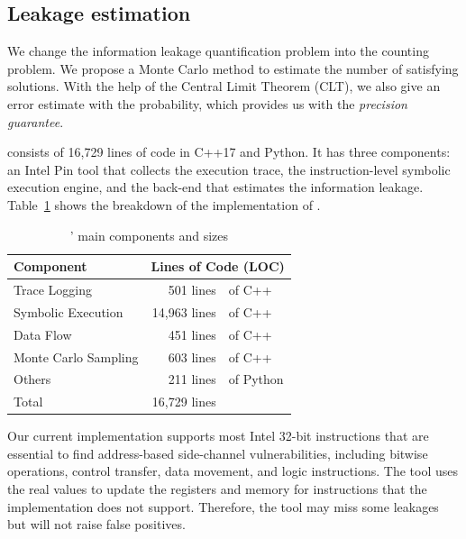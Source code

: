 \subsection{Leakage estimation} 
We change the information leakage quantification problem into the counting problem. We propose a
Monte Carlo method to estimate the number of satisfying solutions. With the help of the Central Limit Theorem (CLT), we also give an error
estimate with the probability, which provides us with the \emph{precision guarantee}.

\tool{} consists of 16,729 lines of code in C++17 and Python. It has three components: an Intel Pin tool that collects the execution trace, the
instruction-level symbolic execution engine, and the back-end that estimates the information leakage. Table~\ref{tbl:implementation} shows the breakdown of the implementation of \tool{}.

\begin{table}[h!]
    \centering
    \caption{\tool{}' main components and sizes}\label{tbl:implementation}
    \begin{tabular}{lr@{~}@{}l}
        \hline
        Component            & \multicolumn{2}{c}{Lines of Code (LOC)}             \\ \hline
        Trace Logging        & 501 lines                               & of C++    \\
        Symbolic Execution   & 14,963 lines                            & of C++    \\
        Data Flow            & 451 lines                               & of C++    \\
        Monte Carlo Sampling & 603 lines                               & of C++    \\
        Others               & 211 lines                               & of Python \\ \hline
        Total                & 16,729 lines                            &           \\\hline
    \end{tabular}
\end{table}

Our current implementation supports most Intel 32-bit instructions that are essential to find address-based side-channel vulnerabilities, including bitwise operations, control transfer, data movement, and logic instructions. The tool uses the real values to update the registers and memory for instructions that the implementation does not support. Therefore, the tool may miss some leakages but will not raise false positives.

